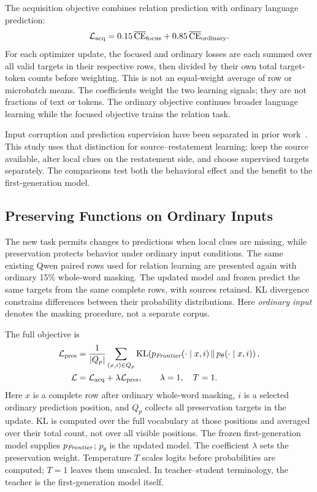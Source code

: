 The acquisition objective combines relation prediction with ordinary language prediction:
\begin{equation}
\mathcal L_{\mathrm{acq}}
=0.15\,\overline{\operatorname{CE}}_{\mathrm{focus}}
+0.85\,\overline{\operatorname{CE}}_{\mathrm{ordinary}}.
\label{eq:acquisition}
\end{equation}
For each optimizer update, the focused and ordinary losses are each summed over all valid targets in their respective rows, then divided by their own total target-token counts before weighting. This is not an equal-weight average of row or microbatch means. The coefficients weight the two learning signals; they are not fractions of text or tokens. The ordinary objective continues broader language learning while the focused objective trains the relation task.

Input corruption and prediction supervision have been separated in prior work~\citep{wettig2023mask}. This study uses that distinction for source--restatement learning: keep the source available, alter local clues on the restatement side, and choose supervised targets separately. The comparisons test both the behavioral effect and the benefit to the first-generation model.

\subsection{Preserving Functions on Ordinary Inputs}

The new task permits changes to predictions when local clues are missing, while preservation protects behavior under ordinary input conditions. The same existing Qwen paired rows used for relation learning are presented again with ordinary 15\% whole-word masking. The updated model and frozen \Frontier{} predict the same targets from the same complete rows, with sources retained. KL divergence constrains differences between their probability distributions. Here \emph{ordinary input} denotes the masking procedure, not a separate corpus.

The full objective is
\begin{align}
\mathcal L_{\mathrm{pres}}
&=\frac{1}{|Q_p|}\sum_{(x,i)\in Q_p}
\operatorname{KL}\!\left(p_{\textit{Frontier}}(\cdot\mid x,i)\,\|\,p_\theta(\cdot\mid x,i)\right),\\
\mathcal L&=\mathcal L_{\mathrm{acq}}+\lambda\mathcal L_{\mathrm{pres}},
\qquad\lambda=1,\quad T=1.
\label{eq:preservation}
\end{align}
Here $x$ is a complete row after ordinary whole-word masking, $i$ is a selected ordinary prediction position, and $Q_p$ collects all preservation targets in the update. KL is computed over the full vocabulary at those positions and averaged over their total count, not over all visible positions. The frozen first-generation model supplies $p_{\textit{Frontier}}$; $p_\theta$ is the updated model. The coefficient $\lambda$ sets the preservation weight. Temperature $T$ scales logits before probabilities are computed; $T=1$ leaves them unscaled. In teacher--student terminology, the teacher is the first-generation model itself.

